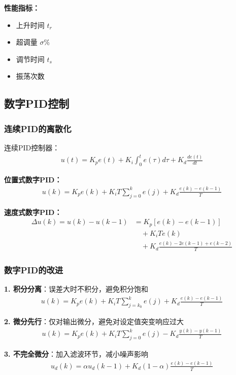 \textbf{性能指标：}
\begin{itemize}
    \item 上升时间 $t_r$
    \item 超调量 $\sigma\%$
    \item 调节时间 $t_s$
    \item 振荡次数
\end{itemize}

\subsection{数字PID控制}

\subsubsection{连续PID的离散化}

连续PID控制器：
\begin{align*}
u(t) = K_p e(t) + K_i \int_0^t e(\tau) d\tau + K_d \frac{de(t)}{dt}
\end{align*}

\textbf{位置式数字PID：}
\begin{align*}
u(k) = K_p e(k) + K_i T \sum_{j=0}^k e(j) + K_d \frac{e(k) - e(k-1)}{T}
\end{align*}

\textbf{速度式数字PID：}
\begin{align*}
\Delta u(k) = u(k) - u(k-1) &= K_p [e(k) - e(k-1)] \\
&\quad + K_i T e(k) \\
&\quad + K_d \frac{e(k) - 2e(k-1) + e(k-2)}{T}
\end{align*}

\subsubsection{数字PID的改进}

\textbf{1. 积分分离}：误差大时不积分，避免积分饱和
\begin{align*}
u(k) = K_p e(k) + K_i T \sum_{j=k_0}^k e(j) + K_d \frac{e(k) - e(k-1)}{T}
\end{align*}

\textbf{2. 微分先行}：仅对输出微分，避免对设定值突变响应过大
\begin{align*}
u(k) = K_p e(k) + K_i T \sum_{j=0}^k e(j) - K_d \frac{y(k) - y(k-1)}{T}
\end{align*}

\textbf{3. 不完全微分}：加入滤波环节，减小噪声影响
\begin{align*}
u_d(k) = \alpha u_d(k-1) + K_d (1-\alpha) \frac{e(k) - e(k-1)}{T}
\end{align*}

